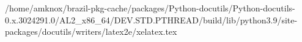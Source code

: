 /home/amknox/brazil-pkg-cache/packages/Python-docutils/Python-docutils-0.x.3024291.0/AL2_x86_64/DEV.STD.PTHREAD/build/lib/python3.9/site-packages/docutils/writers/latex2e/xelatex.tex